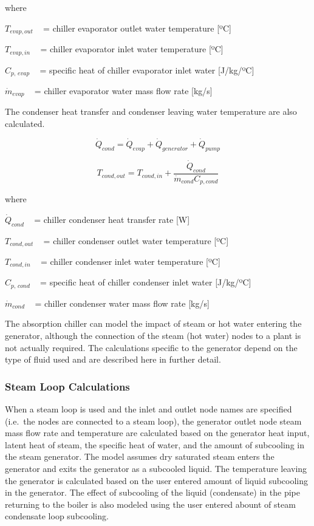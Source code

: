 where

\({T_{evap,out}}\) ~ = chiller evaporator outlet water temperature {[}ºC{]}

\({T_{evap,in}}\) ~ = chiller evaporator inlet water temperature {[}ºC{]}

\({C_{p,\,evap}}\) ~ = specific heat of chiller evaporator inlet water {[}J/kg/ºC{]}

\({\dot m_{evap}}\) ~ = chiller evaporator water mass flow rate {[}kg/s{]}

The condenser heat transfer and condenser leaving water temperature are also calculated.

\begin{equation}
{\dot Q_{cond}} = {\dot Q_{evap}} + {\dot Q_{generator}} + {\dot Q_{pump}}
\end{equation}

\begin{equation}
  T_{cond,out} = T_{cond,in} + \frac{\dot{Q}_{cond}}{\dot{m}_{cond}C_{p,cond}}
\end{equation}

where

\({\dot Q_{cond}}\) ~ = chiller condenser heat transfer rate {[}W{]}

\({T_{cond,out}}\) ~ = chiller condenser outlet water temperature {[}ºC{]}

\({T_{cond,in}}\) ~ = chiller condenser inlet water temperature {[}ºC{]}

\({C_{p,\,cond}}\) ~ = specific heat of chiller condenser inlet water {[}J/kg/ºC{]}

\({\dot m_{cond}}\) ~ = chiller condenser water mass flow rate {[}kg/s{]}

The absorption chiller can model the impact of steam or hot water entering the generator, although the connection of the steam (hot water) nodes to a plant is not actually required. The calculations specific to the generator depend on the type of fluid used and are described here in further detail.

\subsubsection{Steam Loop Calculations}\label{steam-loop-calculations-1}

When a steam loop is used and the inlet and outlet node names are specified (i.e.~the nodes are connected to a steam loop), the generator outlet node steam mass flow rate and temperature are calculated based on the generator heat input, latent heat of steam, the specific heat of water, and the amount of subcooling in the steam generator. The model assumes dry saturated steam enters the generator and exits the generator as a subcooled liquid. The temperature leaving the generator is calculated based on the user entered amount of liquid subcooling in the generator. The effect of subcooling of the liquid (condensate) in the pipe returning to the boiler is also modeled using the user entered abount of steam condensate loop subcooling.

